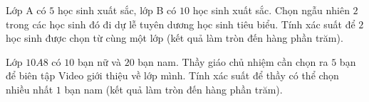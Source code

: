 \begin{bt}%
	Lớp  A có $5$ học sinh xuất sắc, lớp B có $10$ học sinh xuất sắc. Chọn ngẫu nhiên $2$ trong các học sinh đó đi dự lễ tuyên dương học sinh tiêu biểu. Tính xác suất để $2$ học sinh được chọn từ cùng một lớp (kết quả làm tròn đến hàng phần trăm). 
\end{bt}

\begin{bt}%
	Lớp $10A8$ có $10$ bạn nữ và $20$ bạn nam. Thầy giáo chủ nhiệm cần chọn ra $5$ bạn để biên tập Video giới thiệu về lớp mình. Tính xác suất để thầy có thể chọn nhiều nhất $1$  bạn nam (kết quả làm tròn đến hàng phần trăm). 
\end{bt}

